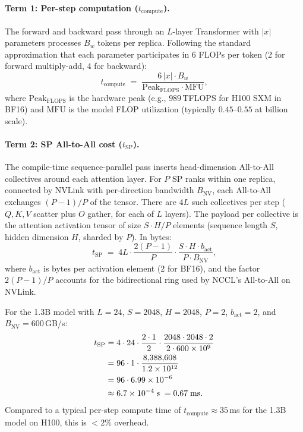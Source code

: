 \documentclass{article}
\begin{document}
\paragraph{Term 1: Per-step computation ($t_{\text{compute}}$).}

The forward and backward pass through an $L$-layer Transformer with
$|x|$ parameters processes $B_w$ tokens per replica. Following the
standard approximation that each parameter participates in $6$ FLOPs
per token (2 for forward multiply-add, 4 for backward):
\begin{equation}
t_{\text{compute}} \;=\;
\frac{6\,|x| \cdot B_w}{\text{Peak}_{\text{FLOPS}} \cdot \text{MFU}},
\label{eq:t_compute}
\end{equation}
where $\text{Peak}_{\text{FLOPS}}$ is the hardware peak (e.g., $989$\,TFLOPS
for H100 SXM in BF16) and $\text{MFU}$ is the model FLOP utilization
(typically $0.45$--$0.55$ at billion scale).

\paragraph{Term 2: SP All-to-All cost ($t_{\text{SP}}$).}

The compile-time sequence-parallel pass inserts head-dimension All-to-All
collectives around each attention layer. For $P$ SP ranks within one
replica, connected by NVLink with per-direction bandwidth $B_{\text{NV}}$,
each All-to-All exchanges $(P-1)/P$ of the tensor. There are $4L$
such collectives per step ($Q, K, V$ scatter plus $O$ gather, for each
of $L$ layers). The payload per collective is the attention activation
tensor of size $S \cdot H / P$ elements (sequence length $S$, hidden
dimension $H$, sharded by $P$). In bytes:
\begin{equation}
t_{\text{SP}} \;=\;
4L \cdot \frac{2(P-1)}{P} \cdot \frac{S \cdot H \cdot b_{\text{act}}}{P \cdot B_{\text{NV}}},
\label{eq:t_sp}
\end{equation}
where $b_{\text{act}}$ is bytes per activation element (2 for BF16),
and the factor $2(P-1)/P$ accounts for the bidirectional ring used by
NCCL's All-to-All on NVLink.

For the 1.3B model with $L = 24$, $S = 2048$, $H = 2048$, $P = 2$,
$b_{\text{act}} = 2$, and $B_{\text{NV}} = 600$\,GB/s:
\begin{align}
t_{\text{SP}}
&= 4 \cdot 24 \cdot \frac{2 \cdot 1}{2} \cdot
   \frac{2048 \cdot 2048 \cdot 2}{2 \cdot 600 \times 10^9}
\notag \\
&= 96 \cdot 1 \cdot \frac{8{,}388{,}608}{1.2 \times 10^{12}}
\notag \\
&= 96 \cdot 6.99 \times 10^{-6}
\notag \\
&\approx 6.7 \times 10^{-4}\;\text{s}
\;= 0.67\;\text{ms}.
\label{eq:t_sp_concrete}
\end{align}
Compared to a typical per-step compute time of $t_{\text{compute}} \approx
35$\,ms for the 1.3B model on H100, this is $< 2\%$ overhead.
\end{document}
